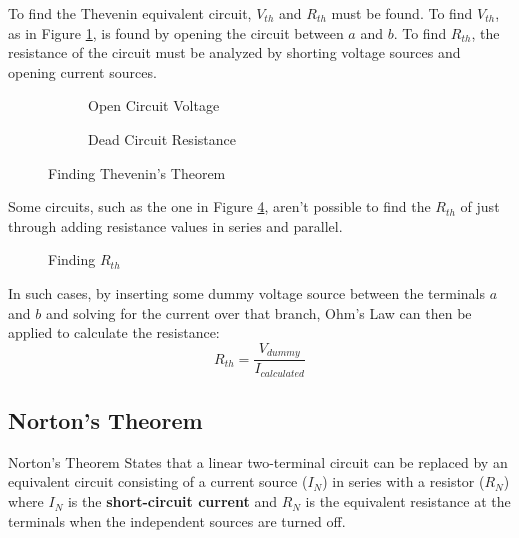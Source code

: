 \documentclass[12pt]{article}
\begin{document}
To find the Thevenin equivalent circuit, $V_{th}$ and $R_{th}$ must be found. To find $V_{th}$, as in Figure \ref{fig:040}, is found by opening the circuit between $a$ and $b$. To find $R_{th}$, the resistance of the circuit must be analyzed by shorting voltage sources and opening current sources.
\begin{figure}[H]
  \centering
  \begin{subfigure}[H]{0.45\textwidth}
    \centering
    
    \caption{Open Circuit Voltage}
    \label{fig:040}
  \end{subfigure}
  \begin{subfigure}[H]{0.45\textwidth}
    \centering
    
    \caption{Dead Circuit Resistance}
    \label{fig:041}
  \end{subfigure}
  \caption{Finding Thevenin's Theorem}
  \label{fig:theveninsTheorem}
\end{figure}
Some circuits, such as the one in Figure \ref{fig:044}, aren't possible to find the $R_{th}$ of just through adding resistance values in series and parallel.
\begin{figure}[H]
  \centering
  
  \caption{Finding $R_{th}$}
  \label{fig:044}
\end{figure}
In such cases, by inserting some dummy voltage source between the terminals $a$ and $b$ and solving for the current over that branch, Ohm's Law can then be applied to calculate the resistance:
\begin{equation*}
  R_{th} = \frac{V_{dummy}}{I_{calculated}}
\end{equation*}

\subsection{Norton's Theorem}
\label{ssec:theveninsTheorem}

\begin{definition}{Norton's Theorem}
  States that a linear two-terminal circuit can be replaced by an equivalent circuit consisting of a current source ($I_{N}$) in series with a resistor ($R_{N}$) where $I_{N}$ is the \textbf{short-circuit current} and $R_{N}$ is the equivalent resistance at the terminals when the independent sources are turned off.
\end{definition}
\end{document}
